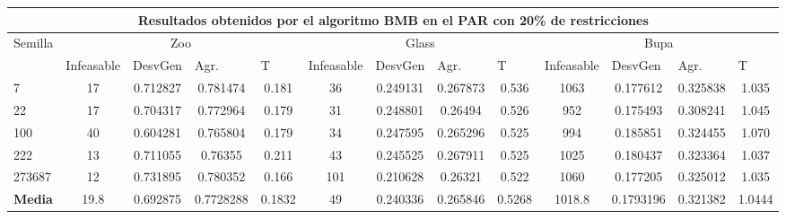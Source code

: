 \begin{table}[H]
	\tiny

	\begin{adjustwidth}{-1cm}{-1cm}%
	
	\begin{tabular}{|l|c|c|c|c|c|c|c|c|c|c|c|c|}
	\hline
	\multicolumn{13}{|c|}{\textbf{Resultados obtenidos por el algoritmo BMB en el PAR con 20\% de restricciones}}                                                                                                                                                                                                                                                                                                                                            \\ \hline
	\multicolumn{1}{|c|}{\multirow{2}{*}{Semilla}} & \multicolumn{4}{c|}{Zoo}                                                                                          & \multicolumn{4}{c|}{Glass}                                                                                         & \multicolumn{4}{c|}{Bupa}                                                                                          \\ \cline{2-13} 
	\multicolumn{1}{|c|}{}                                  & \multicolumn{1}{l|}{Infeasable} & \multicolumn{1}{l|}{DesvGen} & \multicolumn{1}{l|}{Agr.} & \multicolumn{1}{l|}{T} & \multicolumn{1}{l|}{Infeasable} & \multicolumn{1}{l|}{DesvGen} & \multicolumn{1}{l|}{Agr.} & \multicolumn{1}{l|}{T} & \multicolumn{1}{l|}{Infeasable} & \multicolumn{1}{l|}{DesvGen} & \multicolumn{1}{l|}{Agr.} & \multicolumn{1}{l|}{T} \\ \hline
	7   	& 17 & 0.712827 & 0.781474 & 0.181 & 				36 & 0.249131 & 0.267873 & 0.536 &			 	1063 & 0.177612 & 0.325838 & 1.035 		\\ \hline
	22 		& 17 & 0.704317 & 0.772964 & 0.179 &				31 & 0.248801 & 0.26494 & 0.526 &		 	952 & 0.175493 & 0.308241 & 1.045		\\ \hline
	100 	& 40 & 0.604281 & 0.765804 & 0.179 &				 34 & 0.247595 & 0.265296 & 0.525 &				994 & 0.185851 & 0.324455 & 1.070			\\ \hline
	222 	& 13 & 0.711055 & 0.76355 & 0.211 &				43 & 0.245525 & 0.267911 & 0.525 &			1025 & 0.180437 & 0.323364 & 1.037		\\ \hline
	273687 	& 12 & 0.731895 & 0.780352 & 0.166 &				101 & 0.210628 & 0.26321 & 0.522 &				1060 & 0.177205 & 0.325012 & 1.035		\\ \hline
	\textbf{Media} & 19.8	&0.692875	&0.7728288&	0.1832&	49&	0.240336	&0.265846	&0.5268&	1018.8	&0.1793196&	0.321382	& 1.0444  \\ \hline
	\end{tabular}
	
	\end{adjustwidth}
	
\end{table}

